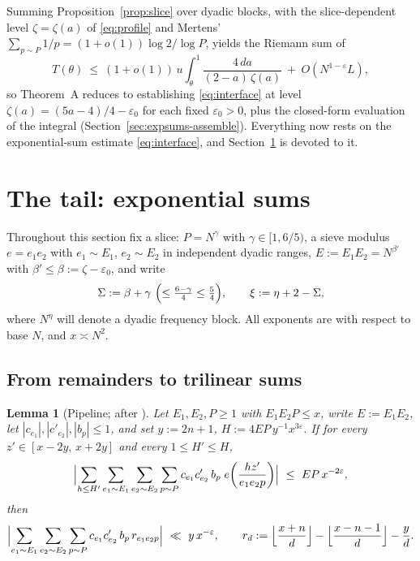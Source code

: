 \documentclass[11pt]{article}
\newtheorem{lemma}[theorem]{Lemma}
\theoremstyle{remark}
\newcommand{\N}{N}
\newcommand{\eof}[1]{e\!\left(#1\right)}
\begin{document}
Summing Proposition~\ref{prop:slice} over dyadic blocks, with the slice-dependent
level $\zeta=\zeta(a)$ of \eqref{eq:profile} and Mertens'
$\sum_{p\sim P}1/p=(1+o(1))\log 2/\log P$, yields the Riemann sum of
\begin{equation}\label{eq:tail-integral}
T(\theta)\ \le\ (1+o(1))\,u\int_{\theta}^{1}\frac{4\,da}{(2-a)\,\zeta(a)}\ +\ O(\N^{1-\varepsilon}L),
\end{equation}
so Theorem~A reduces to establishing \eqref{eq:interface} at level
$\zeta(a)=(5a-4)/4-\varepsilon_0$ for each fixed $\varepsilon_0>0$, plus the closed-form
evaluation of the integral (Section~\ref{sec:expsums-assemble}). Everything now rests
on the exponential-sum estimate \eqref{eq:interface}, and Section~\ref{sec:expsums}
is devoted to it.

\section{The tail: exponential sums}\label{sec:expsums}

Throughout this section fix a slice: $P=\N^{\gamma}$ with $\gamma\in[1,6/5)$,
a sieve modulus $e=e_1e_2$ with $e_1\sim E_1$, $e_2\sim E_2$ in independent dyadic
ranges, $E:=E_1E_2=\N^{\beta'}$ with $\beta'\le\beta:=\zeta-\varepsilon_0$, and write
\[
\Sigma:=\beta+\gamma\ \Bigl(\le \tfrac{6-\gamma}{4}\le\tfrac54\Bigr),
\qquad \xi:=\eta+2-\Sigma ,
\]
where $\N^{\eta}$ will denote a dyadic frequency block. All exponents are with respect
to base $\N$, and $x\asymp \N^2$.

\subsection{From remainders to trilinear sums}\label{sec:pipeline}

\begin{lemma}[Pipeline; after {\cite[Lemma~9]{FI}}]\label{lem:pipeline}
Let $E_1,E_2,P\ge 1$ with $E_1E_2P\le x$, write $E:=E_1E_2$, let
$|c_{e_1}|,|c'_{e_2}|,|b_p|\le 1$, and set $y:=2n+1$, $H:=4EP\,y^{-1}x^{3\varepsilon}$.
If for every $z'\in[x-2y,\,x+2y]$ and every $1\le H'\le H$,
\begin{equation}\label{eq:trilinear-req}
\Bigl|\sum_{h\le H'}\sum_{e_1\sim E_1}\sum_{e_2\sim E_2}\sum_{p\sim P}
c_{e_1}c'_{e_2}\,b_p\; \eof{\frac{h z'}{e_1e_2 p}}\Bigr|
\ \le\ EP\,x^{-2\varepsilon},
\end{equation}
then
\[
\Bigl|\sum_{e_1\sim E_1}\sum_{e_2\sim E_2}\sum_{p\sim P}c_{e_1}c'_{e_2}\,b_p\,r_{e_1e_2p}\Bigr|
\ \ll\ y\,x^{-\varepsilon},
\qquad
r_d:=\Bigl\lfloor\frac{x+n}{d}\Bigr\rfloor-\Bigl\lfloor\frac{x-n-1}{d}\Bigr\rfloor-\frac{y}{d}.
\]
\end{lemma}
\end{document}
